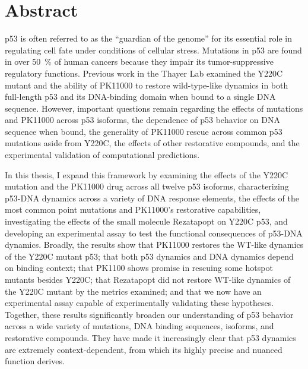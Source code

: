 \documentclass[12pt,oneside]{book}
\newenvironment{abstract}%
{\begin{center}%
	\bfseries\end{center}}%
{\vfill\null}
\begin{document}
\chapter{Abstract}
\begin{abstract}

p53 is often referred to as the ``guardian of the genome'' for its essential role in regulating cell fate under conditions of cellular stress. Mutations in p53 are found in over \qty{50}{\percent} of human cancers because they impair its tumor-suppressive regulatory functions. Previous work in the Thayer Lab examined the Y220C mutant and the ability of PK11000 to restore wild-type-like dynamics in both full-length p53 and its DNA-binding domain when bound to a single DNA sequence. However, important questions remain regarding the effects of mutations and PK11000 across p53 isoforms, the dependence of p53 behavior on DNA sequence when bound, the generality of PK11000 rescue across common p53 mutations aside from Y220C, the effects of other restorative compounds, and the experimental validation of computational predictions.

In this thesis, I expand this framework by examining the effects of the Y220C mutation and the PK11000 drug across all twelve p53 isoforms, characterizing p53-DNA dynamics across a variety of DNA response elements, the effects of the most common point mutations and PK11000's restorative capabilities, investigating the effects of the small molecule Rezatapopt on Y220C p53, and developing an experimental assay to test the functional consequences of p53-DNA dynamics. Broadly, the results show that PK11000 restores the WT-like dynamics of the Y220C mutant p53; that both p53 dynamics and DNA dynamics depend on binding context; that PK1100 shows promise in rescuing some hotspot mutants besides Y220C; that Rezatapopt did not restore WT-like dynamics of the Y220C mutant by the metrics examined; and that we now have an experimental assay capable of experimentally validating these hypotheses. Together, these results significantly broaden our understanding of p53 behavior across a wide variety of mutations, DNA binding sequences, isoforms, and restorative compounds. They have made it increasingly clear that p53 dynamics are extremely context-dependent, from which its highly precise and nuanced function derives.

\end{abstract}

{
\tableofcontents
}
\thispagestyle{empty}
\end{document}
